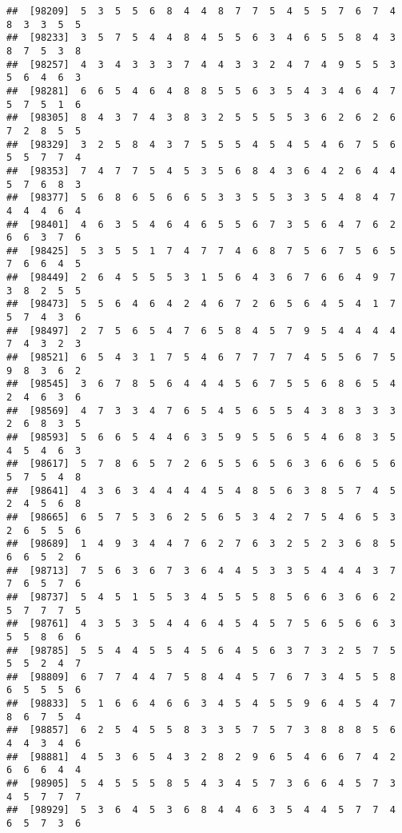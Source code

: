 \documentclass[
]{book}
\begin{document}
\begin{verbatim}
##  [98209]  5  3  5  5  6  8  4  4  8  7  7  5  4  5  5  7  6  7  4  8  3  3  5  5
##  [98233]  3  5  7  5  4  4  8  4  5  5  6  3  4  6  5  5  8  4  3  8  7  5  3  8
##  [98257]  4  3  4  3  3  3  7  4  4  3  3  2  4  7  4  9  5  5  3  5  6  4  6  3
##  [98281]  6  6  5  4  6  4  8  8  5  5  6  3  5  4  3  4  6  4  7  5  7  5  1  6
##  [98305]  8  4  3  7  4  3  8  3  2  5  5  5  5  3  6  2  6  2  6  7  2  8  5  5
##  [98329]  3  2  5  8  4  3  7  5  5  5  4  5  4  5  4  6  7  5  6  5  5  7  7  4
##  [98353]  7  4  7  7  5  4  5  3  5  6  8  4  3  6  4  2  6  4  4  5  7  6  8  3
##  [98377]  5  6  8  6  5  6  6  5  3  3  5  5  3  3  5  4  8  4  7  4  4  4  6  4
##  [98401]  4  6  3  5  4  6  4  6  5  5  6  7  3  5  6  4  7  6  2  6  6  3  7  6
##  [98425]  5  3  5  5  1  7  4  7  7  4  6  8  7  5  6  7  5  6  5  7  6  6  4  5
##  [98449]  2  6  4  5  5  5  3  1  5  6  4  3  6  7  6  6  4  9  7  3  8  2  5  5
##  [98473]  5  5  6  4  6  4  2  4  6  7  2  6  5  6  4  5  4  1  7  5  7  4  3  6
##  [98497]  2  7  5  6  5  4  7  6  5  8  4  5  7  9  5  4  4  4  4  7  4  3  2  3
##  [98521]  6  5  4  3  1  7  5  4  6  7  7  7  7  4  5  5  6  7  5  9  8  3  6  2
##  [98545]  3  6  7  8  5  6  4  4  4  5  6  7  5  5  6  8  6  5  4  2  4  6  3  6
##  [98569]  4  7  3  3  4  7  6  5  4  5  6  5  5  4  3  8  3  3  3  2  6  8  3  5
##  [98593]  5  6  6  5  4  4  6  3  5  9  5  5  6  5  4  6  8  3  5  4  5  4  6  3
##  [98617]  5  7  8  6  5  7  2  6  5  5  6  5  6  3  6  6  6  5  6  5  7  5  4  8
##  [98641]  4  3  6  3  4  4  4  4  5  4  8  5  6  3  8  5  7  4  5  2  4  5  6  8
##  [98665]  6  5  7  5  3  6  2  5  6  5  3  4  2  7  5  4  6  5  3  2  6  5  5  6
##  [98689]  1  4  9  3  4  4  7  6  2  7  6  3  2  5  2  3  6  8  5  6  6  5  2  6
##  [98713]  7  5  6  3  6  7  3  6  4  4  5  3  3  5  4  4  4  3  7  7  6  5  7  6
##  [98737]  5  4  5  1  5  5  3  4  5  5  5  8  5  6  6  3  6  6  2  5  7  7  7  5
##  [98761]  4  3  5  3  5  4  4  6  4  5  4  5  7  5  6  5  6  6  3  5  5  8  6  6
##  [98785]  5  5  4  4  5  5  4  5  6  4  5  6  3  7  3  2  5  7  5  5  5  2  4  7
##  [98809]  6  7  7  4  4  7  5  8  4  4  5  7  6  7  3  4  5  5  8  6  5  5  5  6
##  [98833]  5  1  6  6  4  6  6  3  4  5  4  5  5  9  6  4  5  4  7  8  6  7  5  4
##  [98857]  6  2  5  4  5  5  8  3  3  5  7  5  7  3  8  8  8  5  6  4  4  3  4  6
##  [98881]  4  5  3  6  5  4  3  2  8  2  9  6  5  4  6  6  7  4  2  6  6  6  4  4
##  [98905]  5  4  5  5  5  8  5  4  3  4  5  7  3  6  6  4  5  7  3  4  5  7  7  7
##  [98929]  5  3  6  4  5  3  6  8  4  4  6  3  5  4  4  5  7  7  4  6  5  7  3  6

\end{verbatim}
\end{document}
